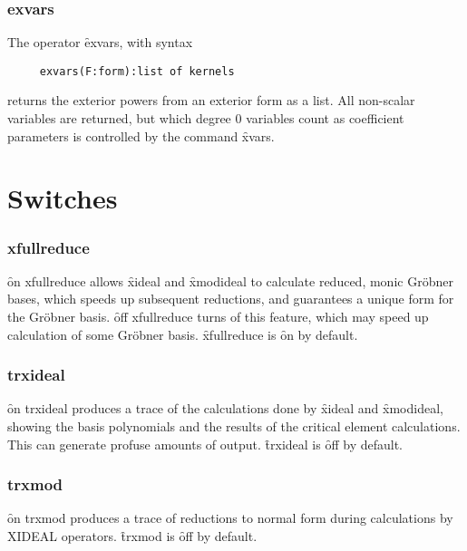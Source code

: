 \subsubsection*{exvars}

The operator \f{exvars}, with syntax
\begin{verbatim}
     exvars(F:form):list of kernels
\end{verbatim}
returns the exterior powers from an exterior form as a list. All non-scalar
variables are returned, but which degree 0 variables count as coefficient
parameters is controlled by the command \f{xvars}.


\section{Switches} 


\subsubsection*{xfullreduce}

\f{on xfullreduce} allows \f{xideal} and \f{xmodideal} to calculate
reduced, monic Gr{\"o}bner bases, which speeds up subsequent reductions, and
guarantees a unique form for the Gr{\"o}bner basis. \f{off xfullreduce} turns
of this feature, which may speed up calculation of some Gr{\"o}bner
basis. \f{xfullreduce} is \f{on} by default.


\subsubsection*{trxideal}

\f{on trxideal} produces a trace of the calculations done by \f{xideal} and
\f{xmodideal}, showing the basis polynomials and the results of the
critical element calculations. This can generate profuse amounts of output.
\f{trxideal} is \f{off} by default.


\subsubsection*{trxmod}

\f{on trxmod} produces a trace of reductions to normal form during
calculations by XIDEAL operators. \f{trxmod} is \f{off} by default.



